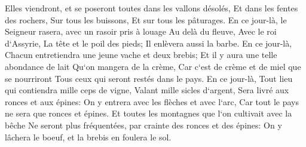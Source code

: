 \verse Elles viendront, et se poseront toutes dans les vallons désolés, Et dans les fentes des rochers, Sur tous les buissons, Et sur tous les pâturages. 
\verse En ce jour-là, le Seigneur rasera, avec un rasoir pris à louage Au delà du fleuve, Avec le roi d`Assyrie, La tête et le poil des pieds; Il enlèvera aussi la barbe. 
\verse En ce jour-là, Chacun entretiendra une jeune vache et deux brebis; 
\verse Et il y aura une telle abondance de lait Qu`on mangera de la crème, Car c`est de crème et de miel que se nourriront Tous ceux qui seront restés dans le pays. 
\verse En ce jour-là, Tout lieu qui contiendra mille ceps de vigne, Valant mille sicles d`argent, Sera livré aux ronces et aux épines: 
\verse On y entrera avec les flèches et avec l`arc, Car tout le pays ne sera que ronces et épines. 
\verse Et toutes les montagnes que l`on cultivait avec la bêche Ne seront plus fréquentées, par crainte des ronces et des épines: On y lâchera le boeuf, et la brebis en foulera le sol. 

